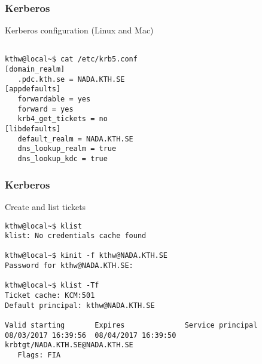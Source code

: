 
\begin{frame}[fragile]
  \frametitle{Kerberos}
  \begin{alertblock}{Kerberos configuration (Linux and Mac)}
    \verbatimfont{\footnotesize}
    \begin{verbatim}

kthw@local~$ cat /etc/krb5.conf
[domain_realm]
   .pdc.kth.se = NADA.KTH.SE
[appdefaults]
   forwardable = yes
   forward = yes
   krb4_get_tickets = no
[libdefaults]
   default_realm = NADA.KTH.SE
   dns_lookup_realm = true
   dns_lookup_kdc = true

 \end{verbatim}
\end{alertblock}

\end{frame}



\begin{frame}[fragile]
  \frametitle{Kerberos}
  \begin{alertblock}{Create and list tickets}
    \verbatimfont{\footnotesize}
    \begin{verbatim}
kthw@local~$ klist
klist: No credentials cache found
      
kthw@local~$ kinit -f kthw@NADA.KTH.SE
Password for kthw@NADA.KTH.SE:

kthw@local~$ klist -Tf  
Ticket cache: KCM:501
Default principal: kthw@NADA.KTH.SE

Valid starting       Expires              Service principal
08/03/2017 16:39:56  08/04/2017 16:39:50  krbtgt/NADA.KTH.SE@NADA.KTH.SE
   Flags: FIA

  \end{verbatim}
  \end{alertblock}

\end{frame}




